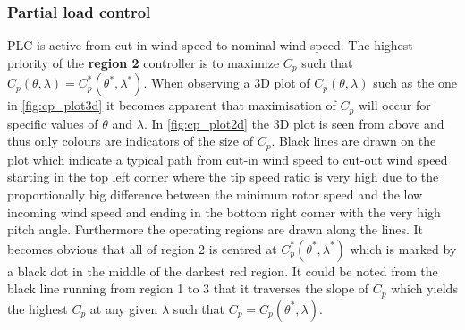 \subsubsection{Partial load control} \label{sec:theory_ctrl_plc}
PLC is active from cut-in wind speed to nominal wind speed. The highest priority of the \textbf{region 2} controller is to maximize $ C_p $ such that $ C_p(\theta, \lambda) = C_p^*(\theta^*, \lambda^*) $. When observing a 3D plot of $ C_p(\theta, \lambda) $ such as the one in \cref{fig:cp_plot3d} it becomes apparent that maximisation of $ C_p $ will occur for specific values of $ \theta $ and $ \lambda $. In \cref{fig:cp_plot2d} the 3D plot is seen from above and thus only colours are indicators of the size of $ C_p $. Black lines are drawn on the plot which indicate a typical path from cut-in wind speed to cut-out wind speed starting in the top left corner where the tip speed ratio is very high due to the proportionally big difference between the minimum rotor speed and the low incoming wind speed and ending in the bottom right corner with the very high pitch angle. Furthermore the operating regions are drawn along the lines. It becomes obvious that all of region 2 is centred at $ C_p^*(\theta^*, \lambda^*) $ which is marked by a black dot in the middle of the darkest red region. It could be noted from the black line running from region 1 to 3 that it traverses the slope of $ C_p $ which yields the highest $ C_p $ at any given $ \lambda $ such that $ C_p = C_p(\theta^*, \lambda) $.
